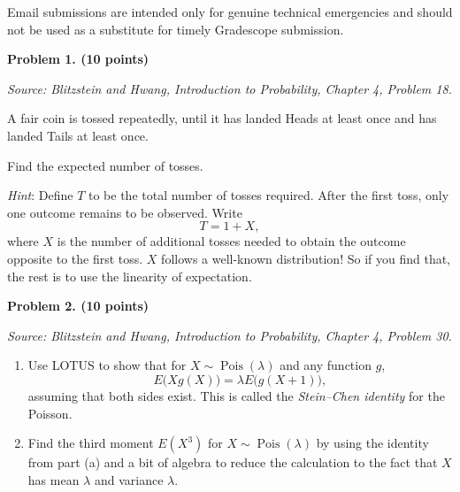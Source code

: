 \documentclass[11pt]{article}
\newcommand{\source}[1]{%
    \vspace{0.15cm}
    {\small\textit{Source: Blitzstein and Hwang, \textit{Introduction to Probability}, Chapter 4, Problem #1.}}
}
\begin{document}
Email submissions are intended only for genuine technical emergencies and should not be used as a substitute for timely Gradescope submission.

\newpage


\begin{problemheader}
\textbf{Problem 1. (10 points)}
\end{problemheader}
\source{18}

A fair coin is tossed repeatedly, until it has landed Heads at least once and has landed Tails at least once.

Find the expected number of tosses.

 
 
\textit{Hint}: Define \(T\) to be the total number of tosses required. After the first toss,
only one outcome remains to be observed. Write
\[
T=1+X,
\]
where \(X\) is the number of additional tosses needed to obtain the outcome
opposite to the first toss. $X$ follows a well-known distribution! So if you find that, the rest is to use the linearity of expectation.
 
 
 
\newpage
 


\begin{problemheader}
\textbf{Problem 2. (10 points) }
\end{problemheader} 
\source{30}

\begin{enumerate}[label=(\alph*), leftmargin=*]
    \item Use LOTUS to show that for $X\sim \operatorname{Pois}(\lambda)$ and any function $g$,
    \[
    E\bigl(Xg(X)\bigr)=\lambda E\bigl(g(X+1)\bigr),
    \]
    assuming that both sides exist. This is called the \emph{Stein--Chen identity} for the Poisson.

    \item Find the third moment $E(X^3)$ for $X\sim\operatorname{Pois}(\lambda)$ by using the identity from part (a) and a bit of algebra to reduce the calculation to the fact that $X$ has mean $\lambda$ and variance $\lambda$.
\end{enumerate}
 
\newpage



\end{document}
